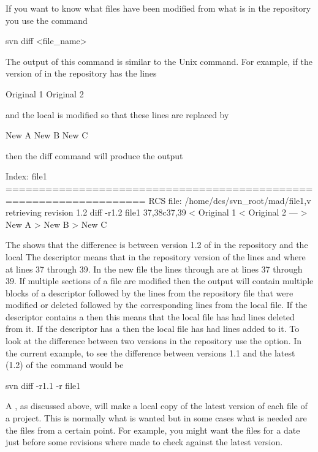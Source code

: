 If you want to know what files have been modified from what is in the
repository you use the command
\begin{example}
  svn diff <file_name>
\end{example}
The output of this command is similar to the Unix  command.
For example, if the version of  in the repository has the lines
\begin{example}
  Original 1
  Original 2
\end{example}
and the local  is modified so that these lines are replaced by
\begin{example}
  New A
  New B
  New C
\end{example}
then the diff command will produce the output
\begin{example}
  Index: file1
  ===================================================================
  RCS file: /home/dcs/svn_root/mad/file1,v
  retrieving revision 1.2
  diff -r1.2 file1
  37,38c37,39
  < Original 1
  < Original 2
  ---
  > New A
  > New B
  > New C
\end{example}
The  shows that the difference is between version
1.2 of  in the repository and the local  The
 descriptor means that in the repository version of
 the lines  and  where at
lines 37 through 39. In the new file the lines  through
 are at lines 37 through 39. If multiple sections of a file
are modified then the  output will contain multiple blocks of
a descriptor followed by the lines from the repository file that were
modified or deleted followed by the corresponding lines from the local
file.  If the descriptor contains a  then this means that the
local file has had lines deleted from it. If the descriptor has a
 then the local file has had lines added to it. To look at the
difference between two versions in the repository use the  option. In the current example, to see the difference
between versions 1.1 and the latest (1.2) of  the command
would be
\begin{example}
  svn diff -r1.1 -r file1
\end{example}

A , as discussed above, will make a local copy of the latest
version of each file of a project. This is normally what is wanted but
in some cases what is needed are the files from a certain point. For
example, you might want the files for a date just before some
revisions where made to check against the latest version. 

